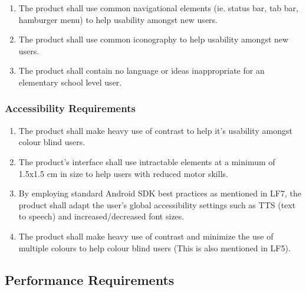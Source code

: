 \documentclass[]{article}
\begin{document}
\begin{enumerate}[{UH}1. ]
 	\resumeEnum
	\item The product shall use common navigational elements (ie. status bar, tab bar, hamburger menu) to help usability amongst new users.
	\item The product shall use common iconography to help usability amongst new users. 
	\item The product shall contain no language or ideas inappropriate for an elementary school level user.
	\holdEnum
\end{enumerate}

\subsubsection{Accessibility Requirements}
\label{ssub:accessibility_requirements}
\begin{enumerate}[{UH}1. ]
	\resumeEnum
	\item The product shall make heavy use of contrast to help it's usability amongst colour blind users.
	\item The product's interface shall use intractable elements at a minimum of 1.5x1.5 cm in size to help users with reduced motor skills.
	\item By employing standard Android SDK best practices as mentioned in LF7, the product shall adapt the user's global accessibility settings such as TTS (text to speech) and increased/decreased font sizes. 
	\item The product shall make heavy use of contrast and minimize the use of multiple colours to help colour blind users (This is also mentioned in LF5).
\end{enumerate}


\subsection{Performance Requirements}
\label{sub:performance_requirements}
\end{document}
